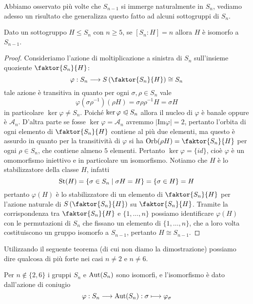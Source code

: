 \documentclass[11pt]{scrartcl}
\begin{document}
Abbiamo osservato più volte che $S_{n - 1}$ si immerge naturalmente in $S_n$,
vediamo adesso un risultato che generalizza questo fatto ad alcuni sottogruppi di 
$S_n$.

\begin{proposition}
    \label{prop1.68}
    Dato un sottogruppo $H\leqslant S_n$ con $n \geq 5$, se $[S_n : H] = n$ allora $H$ è 
    isomorfo a $S_{n - 1}$.
\end{proposition}

\begin{proof}
    Consideriamo l'azione di moltiplicazione a sinistra di $S_n$ sull'insieme
    quoziente $\faktor{S_n}{H}$:
    \[
        \varphi: S_n\longrightarrow S\left(\faktor{S_n}{H}\right) \cong S_n
    \]
    tale azione è transitiva in quanto per ogni $\sigma, \rho \in S_n$ vale
    \[
        \varphi(\sigma\rho^{-1})(\rho H) = \sigma \rho\rho^{-1}H = \sigma H
    \]
    in particolare $\ker \varphi \neq S_n$. Poiché $\ker\varphi \trianglelefteqslant S_n$
    allora il nucleo di $\varphi$ è banale oppure è $\mathcal{A}_n$. D'altra 
    parte se fosse $\ker \varphi = \mathcal{A}_n$ avremmo $|\mathrm{Im}\varphi| = 2$,
    pertanto l'orbita di ogni elemento di $\faktor{S_n}{H}$ contiene al più 
    due elementi, ma questo è assurdo in quanto per la transitività di $\varphi$
    si ha $\Orb(\rho H) = \faktor{S_n}{H}$ per ogni $\rho \in S_n$, che contiene almeno $5$ elementi.
    Pertanto $\ker\varphi = \{id\}$, cioè $\varphi$ è un omomorfismo iniettivo e
    in particolare un isomorfismo.
    Notiamo che $H$ è lo stabilizzatore della classe $H$, infatti
    \[
        \operatorname{St}(H) = \{\sigma \in S_n \mid \sigma H = H\} = \{\sigma \in H\} = H
    \]
    pertanto $\varphi(H)$ è lo stabilizzatore di un elemento di $\faktor{S_n}{H}$
    per l'azione naturale di $S\left(\faktor{S_n}{H}\right)$ su $\faktor{S_n}{H}$.
    Tramite la corrispondenza tra $\faktor{S_n}{H}$ e $\{1, \ldots, n\}$
    possiamo identificare $\varphi(H)$ con le permutazioni di $S_n$ che fissano
    un elemento di $\{1, \ldots, n\}$, che a loro volta costituiscono un 
    gruppo isomorfo a $S_{n - 1}$, pertanto $H \cong S_{n - 1}$.
\end{proof}

Utilizzando il seguente teorema (di cui non diamo la dimostrazione) possiamo
dire qualcosa di più forte nei casi $n \neq 2$ e $n \neq 6$.

\begin{theorem}
    Per $n \notin \{2, 6\}$ i gruppi $S_n$ e $\operatorname{Aut}(S_n)$ sono isomorfi, e 
    l'isomorfismo è dato dall'azione di coniugio
    \[
        \varphi: S_n \longrightarrow \operatorname{Aut}(S_n): \sigma \longmapsto \varphi_{\sigma}
    \]
\end{theorem}
\end{document}

